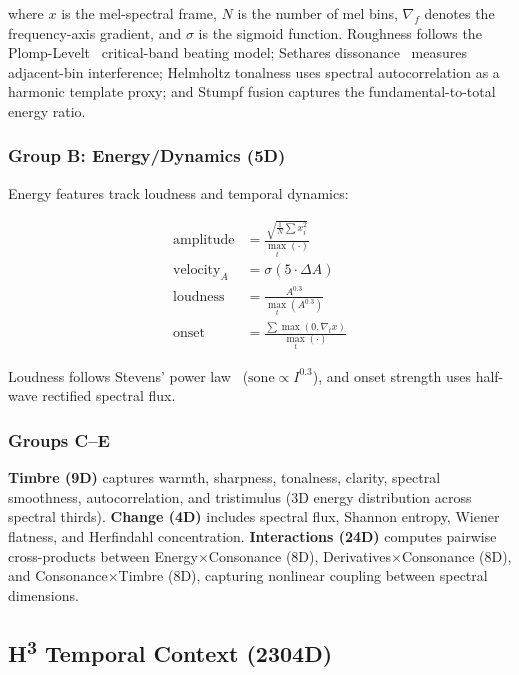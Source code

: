 \documentclass[10pt,twocolumn]{article}
\newcommand{\Htri}{H\textsuperscript{3}}
\newcommand{\sigmoid}{\sigma}
\begin{document}
\noindent where $x$ is the mel-spectral frame, $N$ is the number of mel bins, $\nabla_f$ denotes the frequency-axis gradient, and $\sigma$ is the sigmoid function. Roughness follows the Plomp-Levelt~\cite{Plomp1965} critical-band beating model; Sethares dissonance~\cite{Sethares1997} measures adjacent-bin interference; Helmholtz tonalness uses spectral autocorrelation as a harmonic template proxy; and Stumpf fusion captures the fundamental-to-total energy ratio.

\subsubsection{Group B: Energy/Dynamics (5D)}

Energy features track loudness and temporal dynamics:

\begin{align}
\text{amplitude} &= \frac{\sqrt{\frac{1}{N}\textstyle\sum x_i^2}}{\max_t(\cdot)} \label{eq:amplitude} \\
\text{velocity}_A &= \sigmoid(5 \cdot \Delta A) \label{eq:velocity} \\
\text{loudness} &= \frac{A^{0.3}}{\max_t(A^{0.3})} \label{eq:loudness} \\
\text{onset} &= \frac{\textstyle\sum \max(0, \nabla_t x)}{\max_t(\cdot)} \label{eq:onset}
\end{align}

\noindent Loudness follows Stevens' power law~\cite{Stevens1957} ($\text{sone} \propto I^{0.3}$), and onset strength uses half-wave rectified spectral flux.

\subsubsection{Groups C--E}

\textbf{Timbre (9D)} captures warmth, sharpness, tonalness, clarity, spectral smoothness, autocorrelation, and tristimulus (3D energy distribution across spectral thirds). \textbf{Change (4D)} includes spectral flux, Shannon entropy, Wiener flatness, and Herfindahl concentration. \textbf{Interactions (24D)} computes pairwise cross-products between Energy$\times$Consonance (8D), Derivatives$\times$Consonance (8D), and Consonance$\times$Timbre (8D), capturing nonlinear coupling between spectral dimensions.


\subsection{\Htri{} Temporal Context (2304D)}
\label{sec:h3}
\end{document}
